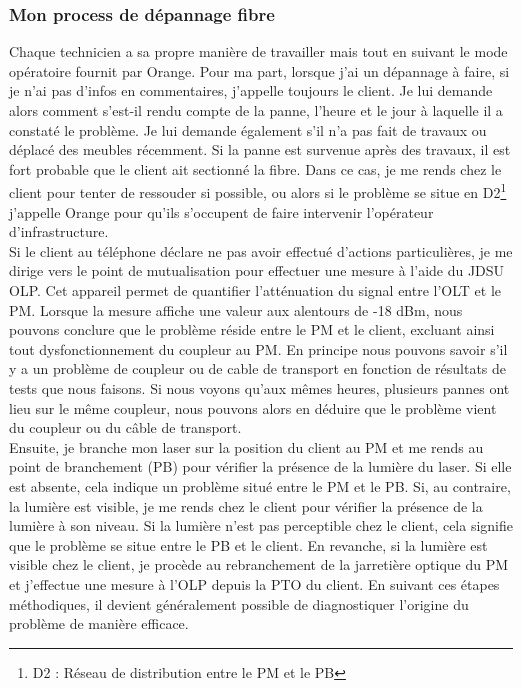 \documentclass[12pt, a4paper]{article}
\begin{document}
\subsubsection{Mon process de dépannage fibre}
Chaque technicien a sa propre manière de travailler mais tout en 
suivant le mode opératoire fournit par Orange. Pour ma part, 
lorsque j'ai un dépannage à faire, si je n'ai pas d'infos en commentaires,
j'appelle toujours le client. Je lui demande alors comment s'est-il
rendu compte de la panne, l'heure et le jour à laquelle il a 
constaté le problème. Je lui demande également s'il n'a pas fait de travaux
ou déplacé des meubles récemment. Si la panne est survenue après
des travaux, il est fort probable que le client ait sectionné la fibre.
Dans ce cas, je me rends chez le client pour tenter de ressouder si possible, 
ou alors si le problème se situe
en D2\footnote{D2 : Réseau de distribution entre le PM et le PB} 
j'appelle Orange pour qu'ils s'occupent de faire intervenir l'opérateur
d'infrastructure.\\

Si le client au téléphone déclare ne pas avoir
effectué d'actions particulières, je me dirige
vers le point de mutualisation pour effectuer
une mesure à l'aide du JDSU OLP. Cet appareil
permet de quantifier l'atténuation du signal
entre l'OLT et le PM. Lorsque la mesure affiche
une valeur aux alentours de -18 dBm, nous pouvons
conclure que le problème réside entre le PM et
le client, excluant ainsi tout dysfonctionnement
du coupleur au PM. En principe nous pouvons savoir 
s'il y a un problème de coupleur ou de cable de transport 
en fonction de résultats de tests que nous faisons. Si nous 
voyons qu'aux mêmes heures, plusieurs pannes ont lieu sur
le même coupleur, nous pouvons alors en déduire que le problème
vient du coupleur ou du câble de transport.\\

Ensuite, je branche mon laser sur la position du client au
PM et me rends au point de branchement
(PB) pour vérifier la présence de la lumière
du laser. Si elle est absente, cela indique
un problème situé entre le PM et le PB.
Si, au contraire, la lumière est visible,
je me rends chez le client pour vérifier
la présence de la lumière à son niveau.
Si la lumière n'est pas perceptible chez le
client, cela signifie que le problème se
situe entre le PB et le client. En revanche,
si la lumière est visible chez le client,
je procède au rebranchement de la jarretière
optique du PM et j'effectue une mesure à l'OLP
depuis la PTO du client. En suivant ces étapes
méthodiques, il devient généralement possible
de diagnostiquer l'origine du problème de
manière efficace.
\end{document}
